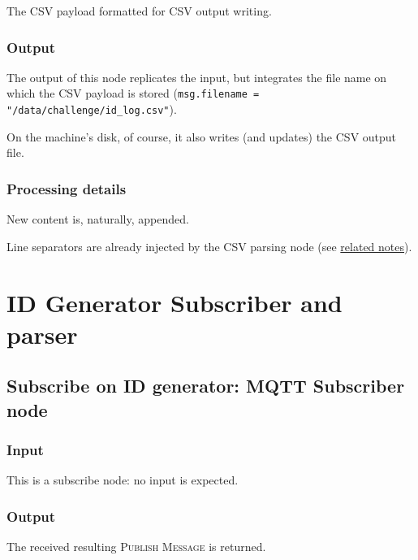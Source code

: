 \documentclass[a4paper,11pt]{article} %
\begin{document}
    The CSV payload formatted for CSV output writing.

    \subsubsection{Output}

    The output of this node replicates the input, but integrates the file name on which the CSV payload is stored (\texttt{msg.filename = "/data/challenge/id\_log.csv"}).

    \smallskip

    On the machine's disk, of course, it also writes (and updates) the CSV output file.

    \subsubsection{Processing details}

    New content is, naturally, appended.

    \smallskip

    Line separators are already injected by the CSV parsing node (see \hyperref[subsec:reformat-for-csv-rules:-function-node]{related notes}).


    \section{ID Generator Subscriber and parser}\label{sec:id-generator-subscriber-and-parser}

    \subsection{Subscribe on ID generator: MQTT Subscriber node}\label{subsec:subscribe-on-id-generator:-mqtt-subscriber-node}

    \subsubsection{Input}

    This is a subscribe node: no input is expected.

    \subsubsection{Output}

    The received resulting \textsc{Publish Message} is returned.

    \smallskip
\end{document}
